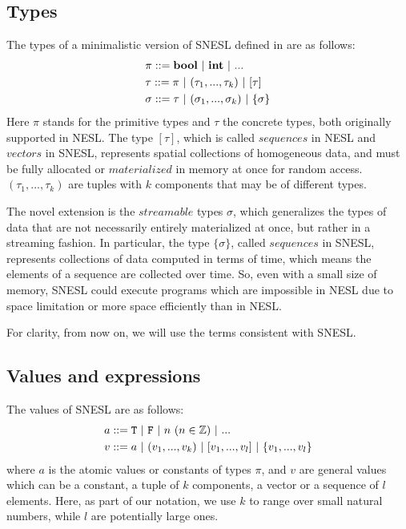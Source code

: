 \subsection{Types}

The types of a minimalistic version of SNESL defined in \cite{Fphd} are as follows:
\begin{align*} 
& \pi ::= \bool \ | \ \int \ | \ ...  \\
& \tau ::= \pi \ | \ (\tau_1,...,\tau_k) \ | \ [\tau]  \\
& \sigma ::= \tau \ | \ (\sigma_1,...,\sigma_k) \ | \ \tseq{\sigma}  
\end{align*}
Here $\pi$ stands for the primitive types and $\tau$ the concrete types, both originally supported in NESL.
The type $[\tau]$, which is called $sequences$ in NESL and $vectors$ in SNESL, represents spatial collections of homogeneous data, and must be
fully allocated or $materialized$ in memory at once for random access.  
$(\tau_1,...,\tau_k)$ are tuples with $k$ components that may be of different types.

The novel extension is the $streamable$ types $\sigma$, which generalizes the types of data that are not necessarily entirely materialized at once, but rather in a streaming fashion. 
In particular, the type $\{\sigma\}$, called $sequences$ in SNESL, represents collections of data computed in terms of time, which means the elements of a sequence are collected over time.
So, even with a small size of memory, SNESL could execute programs which are impossible in NESL due to space limitation or more space efficiently than in NESL. 

For clarity, from now on, we will use the terms consistent with SNESL.

\subsection{Values and expressions}

The values of SNESL are as follows:
\begin{align*}
& a ::=  \T \ | \ \F \ | \ n \ (n \in \mathbb{Z}) \ | \ ... \\
& v ::=  a \ | \ (v_1,...,v_k) \ | \ [v_1,...,v_l] \ | \ \{v_1,...,v_l\} 
\end{align*}
where $a$ is the atomic values or constants of types $\pi$, and $v$ are
 general values which can be a constant, a tuple of $k$ components, a vector or a sequence of $l$ elements. 
Here, as part of our notation, we use $k$ to range over small natural numbers, while $l$ are potentially large ones. 

